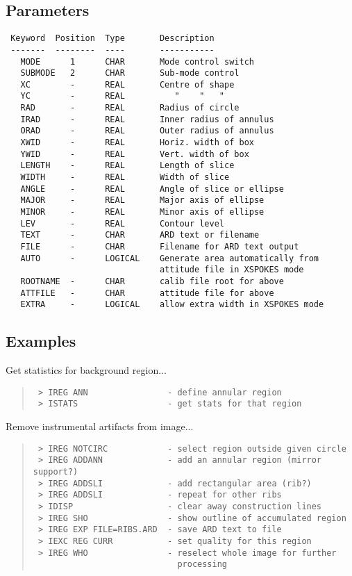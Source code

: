 \documentclass{book}
\renewcommand{\_}{{\tt\char'137}}     %
\begin{document}
\subsection{Parameters}
\begin{verbatim}
 Keyword  Position  Type       Description
 -------  --------  ----       -----------
   MODE      1      CHAR       Mode control switch
   SUBMODE   2      CHAR       Sub-mode control
   XC        -      REAL       Centre of shape
   YC        -      REAL          "    "   "
   RAD       -      REAL       Radius of circle
   IRAD      -      REAL       Inner radius of annulus
   ORAD      -      REAL       Outer radius of annulus
   XWID      -      REAL       Horiz. width of box
   YWID      -      REAL       Vert. width of box
   LENGTH    -      REAL       Length of slice
   WIDTH     -      REAL       Width of slice
   ANGLE     -      REAL       Angle of slice or ellipse
   MAJOR     -      REAL       Major axis of ellipse
   MINOR     -      REAL       Minor axis of ellipse
   LEV       -      REAL       Contour level
   TEXT      -      CHAR       ARD text or filename
   FILE      -      CHAR       Filename for ARD text output
   AUTO      -      LOGICAL    Generate area automatically from
                               attitude file in XSPOKES mode
   ROOTNAME  -      CHAR       calib file root for above
   ATTFILE   -      CHAR       attitude file for above
   EXTRA     -      LOGICAL    allow extra width in XSPOKES mode
\end{verbatim}\subsection{Examples}
Get statistics for background region...
\begin{quote}\begin{verbatim}
 > IREG ANN                - define annular region
 > ISTATS                  - get stats for that region
\end{verbatim}\end{quote}
Remove instrumental artifacts from image...
\begin{quote}\begin{verbatim}
 > IREG NOTCIRC            - select region outside given circle
 > IREG ADDANN             - add an annular region (mirror support?)
 > IREG ADDSLI             - add rectangular area (rib?)
 > IREG ADDSLI             - repeat for other ribs
 > IDISP                   - clear away construction lines
 > IREG SHO                - show outline of accumulated region
 > IREG EXP FILE=RIBS.ARD  - save ARD text to file
 > IEXC REG CURR           - set quality for this region
 > IREG WHO                - reselect whole image for further
                             processing
\end{verbatim}\end{quote}
\end{document}
